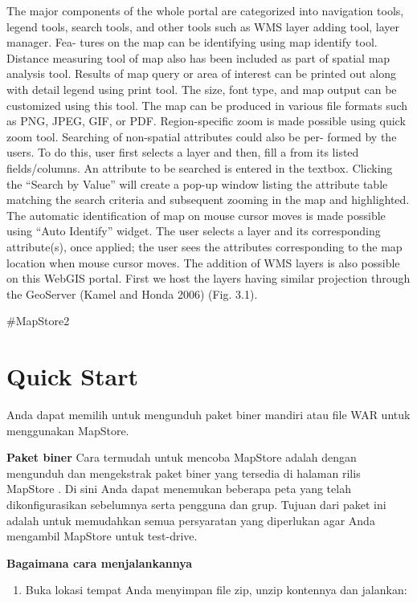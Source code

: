 \documentclass[]{book}
\providecommand{\tightlist}{%
  \setlength{\itemsep}{0pt}\setlength{\parskip}{0pt}}
\begin{document}
The major components of the whole portal are categorized
into navigation tools, legend tools, search tools, and other
tools such as WMS layer adding tool, layer manager. Fea-
tures on the map can be identifying using map identify tool.
Distance measuring tool of map also has been included as
part of spatial map analysis tool. Results of map query or
area of interest can be printed out along with detail legend
using print tool. The size, font type, and map output can be
customized using this tool. The map can be produced in
various file formats such as PNG, JPEG, GIF, or PDF.
Region-specific zoom is made possible using quick zoom
tool.
Searching of non-spatial attributes could also be per-
formed by the users. To do this, user first selects a layer and
then, fill a from its listed fields/columns. An attribute to be
searched is entered in the textbox. Clicking the ``Search by
Value'' will create a pop-up window listing the attribute table
matching the search criteria and subsequent zooming in the
map and highlighted.
The automatic identification of map on mouse cursor
moves is made possible using ``Auto Identify'' widget. The
user selects a layer and its corresponding attribute(s), once
applied; the user sees the attributes corresponding to the map
location when mouse cursor moves.
The addition of WMS layers is also possible on this
WebGIS portal. First we host the layers having similar
projection through the GeoServer (Kamel and Honda 2006)
(Fig. 3.1).

\#MapStore2

\hypertarget{quick-start-1}{%
\section{Quick Start}\label{quick-start-1}}

Anda dapat memilih untuk mengunduh paket biner mandiri atau file WAR untuk menggunakan MapStore.

\textbf{Paket biner}
Cara termudah untuk mencoba MapStore adalah dengan mengunduh dan mengekstrak paket biner yang tersedia di halaman rilis MapStore . Di sini Anda dapat menemukan beberapa peta yang telah dikonfigurasikan sebelumnya serta pengguna dan grup. Tujuan dari paket ini adalah untuk memudahkan semua persyaratan yang diperlukan agar Anda mengambil MapStore untuk test-drive.

\textbf{Bagaimana cara menjalankannya}

\begin{enumerate}
\def\labelenumi{\arabic{enumi}.}
\tightlist
\item
  Buka lokasi tempat Anda menyimpan file zip, unzip kontennya dan jalankan:
\end{enumerate}
\end{document}
